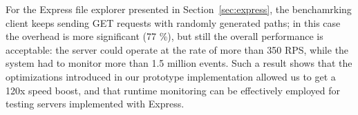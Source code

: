 For the Express file explorer presented in Section~\ref{sec:express}, the benchamrking client keeps sending GET requests
with randomly generated paths; in this case the overhead is more significant (77 \%), but still the overall performance 
is acceptable: the server could operate at the rate of more than 350 RPS, while the system had to monitor more than 1.5 million events.
Such a result shows that the optimizations introduced in our prototype implementation allowed us
to get a 120x speed boost, and that runtime monitoring can be effectively employed for testing servers implemented with Express.
